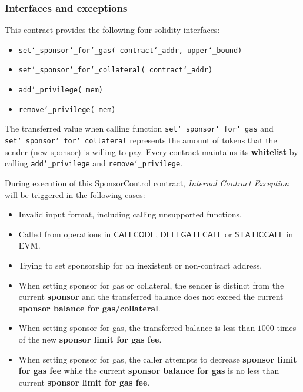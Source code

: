 \subsubsection{Interfaces and exceptions}

This contract provides the following four solidity interfaces:
\begin{itemize}[nosep]
	\item {\tt set\char`_sponsor\char`_for\char`_gas( contract\char`_addr,  upper\char`_bound)}
    \item {\tt set\char`_sponsor\char`_for\char`_collateral( contract\char`_addr)}
    \item {\tt add\char`_privilege( mem)}
    \item {\tt remove\char`_privilege( mem)}
\end{itemize}

The transferred value when calling function {\tt set\char`_sponsor\char`_for\char`_gas} and {\tt set\char`_sponsor\char`_for\char`_collateral} represents the amount of tokens that the sender (new sponsor) is willing to pay.
Every contract maintains its {\bf whitelist} by calling {\tt add\char`_privilege} and {\tt remove\char`_privilege}.

During execution of this SponsorControl contract, \emph{Internal Contract Exception} will be triggered in the following cases:
\begin{itemize}[nosep]
	\item Invalid input format, including calling unsupported functions.
	\item Called from operations in $\mathsf{CALLCODE}$, $\mathsf{DELEGATECALL}$ or $\mathsf{STATICCALL}$ in EVM.
    \item Trying to set sponsorship for an inexistent or non-contract address.
    \item When setting sponsor for gas or collateral, the sender is distinct from the current \textbf{sponsor} and the transferred balance does not exceed the current \textbf{sponsor balance for gas/collateral}.
    \item When setting sponsor for gas, the transferred balance is less than $1000$ times of the new \textbf{sponsor limit for gas fee}.
    \item When setting sponsor for gas, the caller attempts to decrease \textbf{sponsor limit for gas fee} while the current \textbf{sponsor balance for gas} is no less than current \textbf{sponsor limit for gas fee}. 
\end{itemize}

